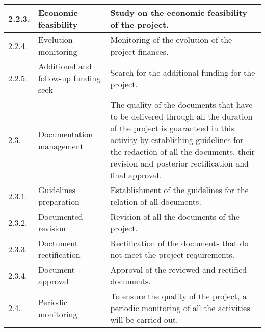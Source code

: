 \begin{longtable}[H]{l >{\raggedright\arraybackslash}p{4cm} p{8cm}}
	\midrule
	
	2.2.3. & Economic feasibility & Study on the economic feasibility of the project.\vspace{0.2cm} \\
	
	\midrule
	
	2.2.4. & Evolution monitoring & Monitoring of the evolution of the project finances.\vspace{0.2cm} \\
	
	\midrule
	
	2.2.5. & Additional and follow-up funding seek & Search for the additional funding for the project.\vspace{0.2cm} \\
	
	\midrule
	
	2.3. & Documentation management & The quality of the documents that have to be delivered through all the duration of the project is guaranteed in this activity by establishing guidelines for the redaction of all the documents, their revision and posterior rectification and final approval.\vspace{0.2cm} \\
	
	\midrule
	
	2.3.1. & Guidelines preparation & Establishment of the guidelines for the relation of all documents.\vspace{0.2cm} \\
	
	\midrule
	
	2.3.2. & Documented revision & Revision of all the documents of the project.\vspace{0.2cm} \\
	
	\midrule
	
	2.3.3. & Doctument rectification & Rectification of the documents that do not meet the project requirements.\vspace{0.2cm} \\
	
	\midrule
	
	2.3.4. & Document approval & Approval of the reviewed and rectified documents.\vspace{0.2cm} \\
	
	\midrule
	
	2.4. & Periodic monitoring & To ensure the quality of the project, a periodic monitoring of all the activities will be carried out.\vspace{0.2cm} \\
	

\end{longtable}
